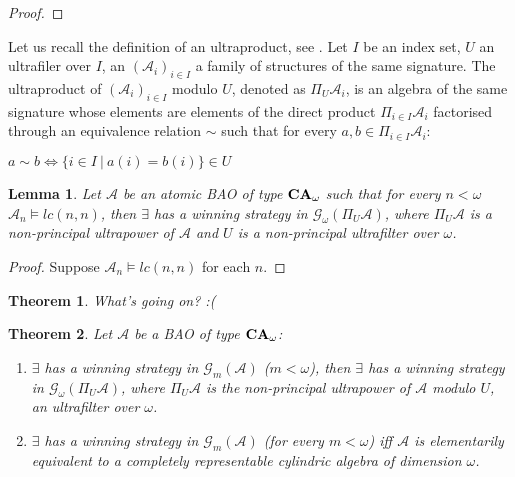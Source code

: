 \documentclass[a4paper]{article}
\theoremstyle{defin}
\theoremstyle{theorem}
\newtheorem{theorem}{Theorem}
\theoremstyle{prop}
\theoremstyle{lemma}
\newtheorem{lemma}{Lemma}
\theoremstyle{fact}
\theoremstyle{ex}
\theoremstyle{col}
\begin{document}
\begin{proof}
\end{proof}

Let us recall the definition of an ultraproduct, see \cite[Section 9.5]{hodges1993model}. Let $I$ be an index set, $U$ an ultrafiler over $I$, an $(\mathcal{A}_i)_{i \in I}$ a family of structures of the same signature. The ultraproduct of $(\mathcal{A}_i)_{i \in I}$ modulo $U$, denoted as $\Pi_U \mathcal{A}_i$, is an algebra of the same signature whose elements are elements of the direct product
$\Pi_{i \in I} \mathcal{A}_i$ factorised through an equivalence relation $\sim$ such that for every $a, b \in \Pi_{i \in I} \mathcal{A}_i$:
\begin{center}
  $a \sim b \Leftrightarrow \{ i \in I \: | \: a(i) = b(i)\} \in U$
\end{center}

\begin{lemma}
  Let $\mathcal{A}$ be an atomic BAO of type ${\bf CA}_{\omega}$ such that for every $n < \omega$ $\mathcal{A}_n \models lc(n,n)$, then $\exists$ has a winning strategy in $\mathcal{G}_{\omega}(\Pi_U \mathcal{A})$, where $\Pi_U \mathcal{A}$ is a non-principal ultrapower of $\mathcal{A}$ and $U$ is a non-principal ultrafilter over $\omega$.
\end{lemma}

\begin{proof}
  Suppose $\mathcal{A}_n \models lc(n,n)$ for each $n$.
\end{proof}

\begin{theorem}
  What's going on? :(
\end{theorem}

\begin{theorem} Let $\mathcal{A}$ be a BAO of type ${\bf CA}_{\omega}$:

\begin{enumerate}
  \item $\exists$ has a winning strategy in $\mathcal{G}_{m}(\mathcal{A})$ ($m < \omega$), then $\exists$ has a winning strategy in $\mathcal{G}_{\omega}(\Pi_U \mathcal{A})$, where $\Pi_U \mathcal{A}$ is the non-principal ultrapower of $\mathcal{A}$ modulo $U$, an ultrafilter over $\omega$.
  \item $\exists$ has a winning strategy in $\mathcal{G}_{m}(\mathcal{A})$ (for every $m < \omega$) iff $\mathcal{A}$ is elementarily equivalent to a completely representable cylindric algebra of dimension $\omega$.
\end{enumerate}
\end{theorem}
\end{document}
